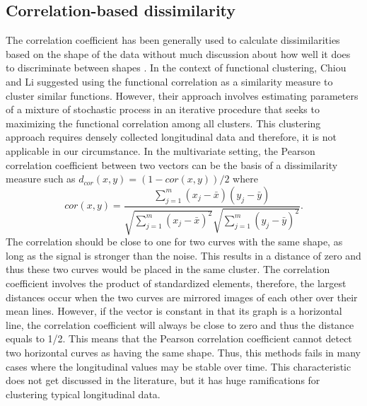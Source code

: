 \documentclass[12pt]{article}
\begin{document}
\subsection{Correlation-based dissimilarity}
The correlation coefficient has been generally used to calculate dissimilarities based on the shape of the data without much discussion about how well it does to discriminate between shapes \cite{chouakria2007,  eisen1998, chiou2008}. In the context of functional clustering, Chiou and Li \cite{chiou2008} suggested using the functional correlation as a similarity measure to cluster similar functions. However, their approach involves estimating parameters of a mixture of stochastic process in an iterative procedure that seeks to maximizing the functional correlation among all clusters. This clustering approach requires densely collected longitudinal data and therefore, it is not applicable in our circumstance. In the multivariate setting, the Pearson correlation coefficient between two vectors can be the basis of a dissimilarity measure such as $d_{cor}(x,y) = (1-cor(x,y))/2$ where $$cor(x,y) = \frac{\sum^{m}_{j=1}(x_{j}-\bar{x})(y_{j}-\bar{y})}{\sqrt{\sum^{m}_{j=1}(x_{j}-\bar{x})^{2}}\sqrt{\sum^{m}_{j=1}(y_{j}-\bar{y})^{2}}}.$$
The correlation should be close to one for two curves with the same shape, as long as the signal is stronger than the noise. This results in a distance of zero and thus these two curves would be placed in the same cluster. The correlation coefficient involves the product of standardized elements, therefore, the largest distances occur when the two curves are mirrored images of each other over their mean lines. However, if the vector is constant in that its graph is a horizontal line, the correlation coefficient will always be close to zero and thus the distance equals to 1/2. This means that the Pearson correlation coefficient cannot detect two horizontal curves as having the same shape. Thus, this methods fails in many cases where the longitudinal values may be stable over time. This characteristic does not get discussed in the literature, but it has huge ramifications for clustering typical longitudinal data.
\end{document}

